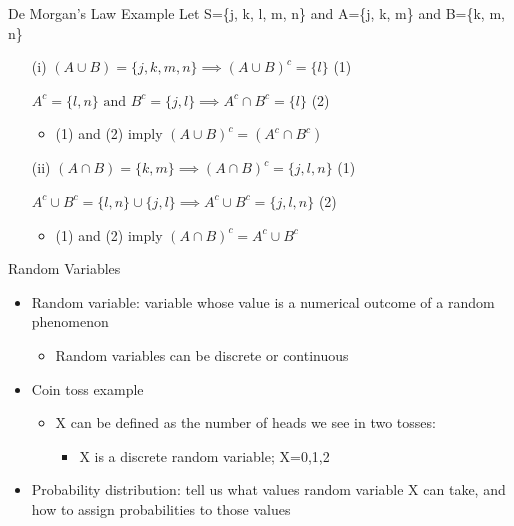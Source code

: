 \documentclass{beamer}
\begin{document}
\begin{frame}{De Morgan's Law Example}
	Let S=\{j, k, l, m, n\} and A=\{j, k, m\} and B=\{k, m, n\}
	\begin{itemize}
		
		\item[(i)]
		      $(A \cup B)= \{j, k, m, n\} \implies (A \cup B)^c=\{l\}$ \hspace{14mm} (1)
		      
		      $A^c = \{l, n\} \text{ and }B^c=\{j, l\} \implies A^c \cap B^c = \{l\}$ \hspace{8mm} (2)
		      \begin{itemize}
		      	
		      	\item (1) and (2) imply $(A \cup B)^c = (A^c \cap B^c)$
		      \end{itemize}
		      
		\item[(ii)] 
		      $(A \cap B)=\{k,m\} \implies (A \cap B)^c=\{j, l, n\}$ \hspace{14mm} (1) 
		      
		      $A^c \cup B^c=\{l, n\} \cup \{j, l\} \implies A^c \cup B^c = \{j, l, n\}$ \hspace{4mm} (2) 
		       
		      \begin{itemize}
		      	\item (1) and (2) imply $(A \cap B)^c = A^c \cup B^c$
		      \end{itemize}
	\end{itemize}
\end{frame}



\begin{frame}{Random Variables}
	
	\begin{itemize}
		\item \alert{Random variable}: variable whose value is a numerical outcome of a random phenomenon
		      \begin{itemize}
		      	\item Random variables can be discrete or continuous
		      \end{itemize}
		\item Coin toss example
		      \begin{itemize}
		      	\item X can be defined as the number of heads we see in two tosses:
		      	      \begin{itemize}
		      	      	\item X is a discrete random variable; X=0,1,2
		      	      \end{itemize}
		      \end{itemize}
		\item \alert{Probability distribution}: tell us what values random variable X can take, and how to assign probabilities to those values
	\end{itemize}
	
\end{frame}
\end{document}
